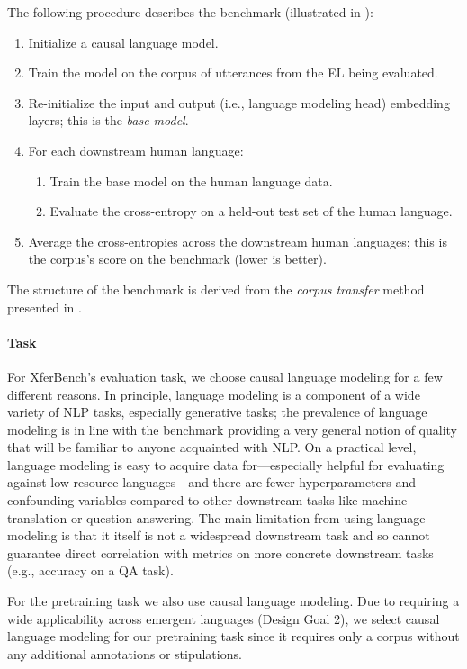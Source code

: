 The following procedure describes the benchmark (illustrated in ):
\begin{enumerate}[nosep]
  \item Initialize a causal language model.
  \item Train the model on the corpus of utterances from the EL being evaluated.
  \item Re-initialize the input and output (i.e., language modeling head) embedding layers;
    this is the \textit{base model}.
  \item For each downstream human language:
    \begin{enumerate}
      \item Train the base model on the human language data.
      \item Evaluate the cross-entropy on a held-out test set of the human language.
    \end{enumerate}
  \item Average the cross-entropies across the downstream human languages;
    this is the corpus's score on the benchmark (lower is better).
\end{enumerate}
The structure of the benchmark is derived from the \emph{corpus transfer} method presented in \citet{yao2022linking}.

\paragraph{Task}
For XferBench's evaluation task, we choose causal language modeling for a few different reasons.
In principle, language modeling is a component of a wide variety of NLP tasks, especially generative tasks;
  the prevalence of language modeling is in line with the benchmark providing a very general notion of quality that will be familiar to anyone acquainted with NLP\@.
On a practical level, language modeling is easy to acquire data for---especially helpful for evaluating against low-resource languages---and there are fewer hyperparameters and confounding variables compared to other downstream tasks like machine translation or question-answering.
The main limitation from using language modeling is that it itself is not a widespread downstream task and so cannot guarantee direct correlation with metrics on more concrete downstream tasks (e.g., accuracy on a QA task).

For the pretraining task we also use causal language modeling.
Due to requiring a wide applicability across emergent languages (Design Goal 2), we select causal language modeling for our pretraining task since it requires only a corpus without any additional annotations or stipulations.


